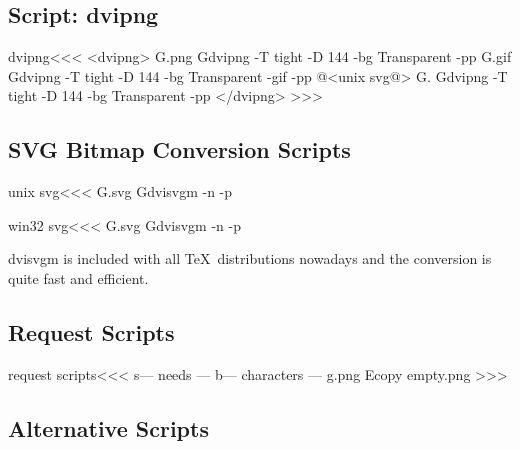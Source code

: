 \documentclass{article}
\begin{document}
\subsection{Script: dvipng}

 \<dvipng\><<<
 <dvipng>
G.png
Gdvipng -T tight -D 144 -bg Transparent -pp %
G.gif
Gdvipng -T tight -D 144 -bg Transparent -gif -pp %
@<unix svg@>
G.
Gdvipng -T tight -D 144 -bg Transparent -pp %
  </dvipng>
>>>


\subsection{SVG Bitmap Conversion Scripts} 

\<unix svg\><<<
G.svg
Gdvisvgm -n -p %


\<win32 svg\><<<
G.svg
Gdvisvgm -n -p %

dvisvgm is included with all \TeX\ distributions nowadays and the
conversion is quite fast and efficient.


\subsection{Request Scripts}

\<request scripts\><<<
 s--- needs --- %
 b--- characters ---
 g.png
 Ecopy  empty.png %
>>>


\subsection{Alternative Scripts}
\end{document}
